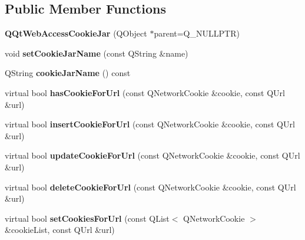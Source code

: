 \subsection*{Public Member Functions}
\begin{DoxyCompactItemize}
\item 
\mbox{\label{class_q_qt_web_access_cookie_jar_a893b439912e9854f3ba73c07b0dcbab0}} 
{\bfseries Q\+Qt\+Web\+Access\+Cookie\+Jar} (Q\+Object $\ast$parent=Q\+\_\+\+N\+U\+L\+L\+P\+TR)
\item 
\mbox{\label{class_q_qt_web_access_cookie_jar_add31621253550587454c2d754ad8d188}} 
void {\bfseries set\+Cookie\+Jar\+Name} (const Q\+String \&name)
\item 
\mbox{\label{class_q_qt_web_access_cookie_jar_a23ee2a6fe9cbb4d25b3d660aa67dad81}} 
Q\+String {\bfseries cookie\+Jar\+Name} () const
\item 
\mbox{\label{class_q_qt_web_access_cookie_jar_a427462f70c22fb39c9e756966ce1741a}} 
virtual bool {\bfseries has\+Cookie\+For\+Url} (const Q\+Network\+Cookie \&cookie, const Q\+Url \&url)
\item 
\mbox{\label{class_q_qt_web_access_cookie_jar_aedc7447c66caa009b7b4268b57dccff6}} 
virtual bool {\bfseries insert\+Cookie\+For\+Url} (const Q\+Network\+Cookie \&cookie, const Q\+Url \&url)
\item 
\mbox{\label{class_q_qt_web_access_cookie_jar_ac123605e8a496301eb8aee8ed4f32d7a}} 
virtual bool {\bfseries update\+Cookie\+For\+Url} (const Q\+Network\+Cookie \&cookie, const Q\+Url \&url)
\item 
\mbox{\label{class_q_qt_web_access_cookie_jar_ad763f7d82c68f4b918ea4d2dc68a7502}} 
virtual bool {\bfseries delete\+Cookie\+For\+Url} (const Q\+Network\+Cookie \&cookie, const Q\+Url \&url)
\item 
\mbox{\label{class_q_qt_web_access_cookie_jar_aa4748d3e10f1d911fe9cc708f2a0fbf8}} 
virtual bool {\bfseries set\+Cookies\+For\+Url} (const Q\+List$<$ Q\+Network\+Cookie $>$ \&cookie\+List, const Q\+Url \&url)
\end{DoxyCompactItemize}
